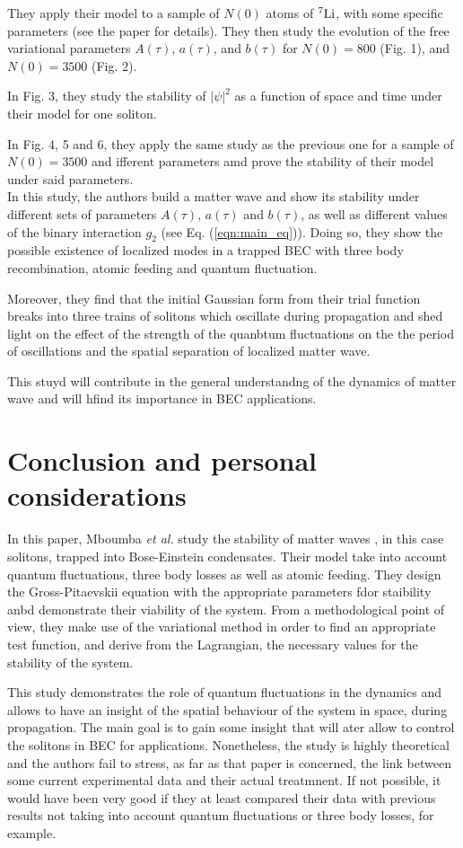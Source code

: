 \documentclass[a4paper]{article}
\begin{document}
They apply their model to a sample of $N(0)$ atoms of ${}^7{\rm Li}$, 
with some specific parameters (see the paper for details).
They then study the evolution of the free variational parameters 
$A(\tau)$, $a(\tau)$, and $b(\tau)$ for 
$N(0)=800$ (Fig. 1), and 
$N(0)=3500$ (Fig. 2). 

In Fig. 3, they study the stability of $|\psi|^2$ as a function of space
and time under their model for one soliton.

In Fig. 4, 5 and 6, they apply the same study as the previous one for 
a sample of $N(0)=3500$ and ifferent parameters amd prove the stability 
of their model under said parameters. \\


In this study, the authors build a matter wave and show its stability under
different sets of parameters $A(\tau)$, $a(\tau)$ and $b(\tau)$, as well
as different values of the binary interaction $g_2$ 
(see Eq. (\ref{eqn:main_eq})).
Doing so, they show the possible existence of localized modes in a trapped 
BEC with three body recombination, atomic feeding and quantum fluctuation.

Moreover, they find that the initial Gaussian form from their trial function 
breaks into three trains of solitons which oscillate during propagation
and shed light on the effect of the strength of the quanbtum fluctuations
on the the period of oscillations and the spatial separation of
localized matter wave.

This stuyd will contribute in the general understandng of the dynamics 
of matter wave and will hfind its importance in BEC applications.

\newpage

\section{Conclusion and personal considerations}

In this paper, Mboumba \textit{et al.} study the stability of matter waves , in this case solitons, trapped into Bose-Einstein condensates. Their model
take into account quantum fluctuations, three body losses as well as 
atomic feeding. They design the Gross-Pitaevskii equation with the appropriate 
parameters fdor staibility anbd demonstrate their viability of the system.
From a methodological point of view, they make use of the variational method 
in order to find an appropriate test function, and derive from the Lagrangian, 
the necessary values for the stability of the system. 

This study demonstrates the role of quantum fluctuations in the dynamics and 
allows to have an insight of the spatial behaviour of the system in space, 
during propagation. 
The main goal is to gain some insight that will ater allow to control
the solitons in BEC for applications.
Nonetheless, the study is highly theoretical and the authors fail to stress,
as far as that paper is concerned, the link between some current experimental 
data and their actual treatmnent. If not possible, it would have been very good if they at least compared their data with previous results not taking into 
account quantum fluctuations or three body losses, for example.
\end{document}
